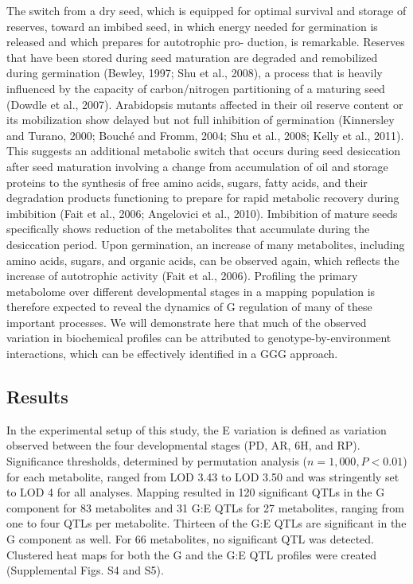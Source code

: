 The switch from a dry seed, which is equipped for optimal survival and storage of reserves, toward an
imbibed seed, in which energy needed for germination is released and which prepares for autotrophic pro-
duction, is remarkable. Reserves that have been stored during seed maturation are degraded and remobilized
during germination (Bewley, 1997; Shu et al., 2008), a process that is heavily influenced by the capacity 
of carbon/nitrogen partitioning of a maturing seed (Dowdle et al., 2007). Arabidopsis mutants affected 
in their oil reserve content or its mobilization show delayed but not full inhibition of germination 
(Kinnersley and Turano, 2000; Bouché and Fromm, 2004; Shu et al., 2008; Kelly et al., 2011). This suggests 
an additional metabolic switch that occurs during seed desiccation after seed maturation involving a change 
from accumulation of oil and storage proteins to the synthesis of free amino acids, sugars, fatty acids, 
and their degradation products functioning to prepare for rapid metabolic recovery during imbibition 
(Fait et al., 2006; Angelovici et al., 2010). Imbibition of mature seeds specifically shows reduction of 
the metabolites that accumulate during the desiccation period. Upon germination, an increase of many 
metabolites, including amino acids, sugars, and organic acids, can be observed again, which reflects 
the increase of autotrophic activity (Fait et al., 2006). Profiling the primary metabolome over different 
developmental stages in a mapping population is therefore expected to reveal the dynamics of G regulation 
of many of these important processes. We will demonstrate here that much of the observed variation in 
biochemical profiles can be attributed to genotype-by-environment interactions, which can be effectively 
identified in a GGG approach.

\subsection{Results}
In the experimental setup of this study, the E variation is defined as variation observed between the four
developmental stages (PD, AR, 6H, and RP). Significance thresholds, determined by permutation analysis
($n = 1,000, P < 0.01$) for each metabolite, ranged from LOD 3.43 to LOD 3.50 and was stringently set to 
LOD 4 for all analyses. Mapping resulted in 120 significant QTLs in the G component for 83 metabolites and 
31 G:E QTLs for 27 metabolites, ranging from one to four QTLs per metabolite. Thirteen of the G:E QTLs are
significant in the G component as well. For 66 metabolites, no significant QTL was detected. Clustered 
heat maps for both the G and the G:E QTL profiles were created (Supplemental Figs. S4 and S5).

